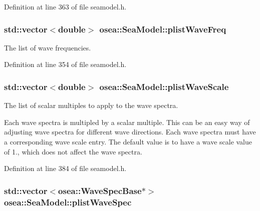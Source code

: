 Definition at line 363 of file seamodel.\-h.

\hypertarget{classosea_1_1_sea_model_a9dbf5842fe27aec73fe1694c837ed052}{
\subsubsection[{plist\-Wave\-Freq}]{\setlength{\rightskip}{0pt plus 5cm}std\-::vector$<$double$>$ osea\-::\-Sea\-Model\-::plist\-Wave\-Freq\hspace{0.3cm}{\ttfamily [protected]}}}\label{classosea_1_1_sea_model_a9dbf5842fe27aec73fe1694c837ed052}
The list of wave frequencies. 

Definition at line 354 of file seamodel.\-h.

\hypertarget{classosea_1_1_sea_model_a8c099ee28555ea1ac4795a05598b6027}{
\subsubsection[{plist\-Wave\-Scale}]{\setlength{\rightskip}{0pt plus 5cm}std\-::vector$<$double$>$ osea\-::\-Sea\-Model\-::plist\-Wave\-Scale\hspace{0.3cm}{\ttfamily [protected]}}}\label{classosea_1_1_sea_model_a8c099ee28555ea1ac4795a05598b6027}


The list of scalar multiples to apply to the wave spectra. 

Each wave spectra is multipled by a scalar multiple. This can be an easy way of adjusting wave spectra for different wave directions. Each wave spectra must have a corresponding wave scale entry. The default value is to have a wave scale value of 1., which does not affect the wave spectra. 

Definition at line 384 of file seamodel.\-h.

\hypertarget{classosea_1_1_sea_model_a6ff2ff29955714965406a26a5f2e09b1}{
\subsubsection[{plist\-Wave\-Spec}]{\setlength{\rightskip}{0pt plus 5cm}std\-::vector$<${\bf osea\-::\-Wave\-Spec\-Base}$\ast$$>$ osea\-::\-Sea\-Model\-::plist\-Wave\-Spec\hspace{0.3cm}{\ttfamily [protected]}}}\label{classosea_1_1_sea_model_a6ff2ff29955714965406a26a5f2e09b1}


